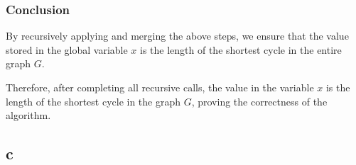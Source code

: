 \documentclass[12pt]{article}
\begin{document}
        \subsubsection*{Conclusion}
        By recursively applying and merging the above steps, we ensure that the value stored in the global variable \( x \) is the length of the shortest cycle in the entire graph \( G \).

        Therefore, after completing all recursive calls, the value in the variable \( x \) is the length of the shortest cycle in the graph \( G \), proving the correctness of the algorithm.

    \subsection*{c}

        
\end{document}
